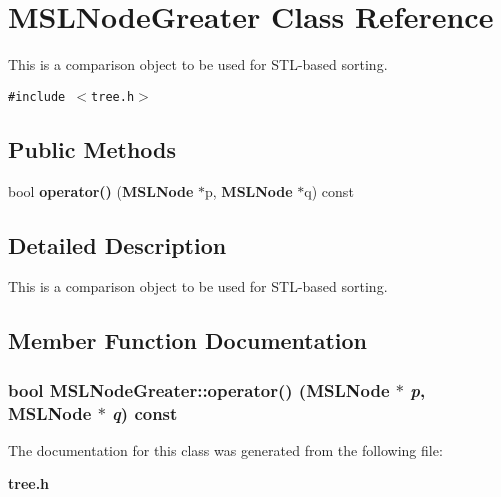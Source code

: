 \section{MSLNode\-Greater  Class Reference}
\label{classMSLNodeGreater}
This is a comparison object to be used for STL-based sorting. 


{\tt \#include $<$tree.h$>$}

\subsection*{Public Methods}
\begin{CompactItemize}
\item 
bool {\bf operator()} ({\bf MSLNode} $\ast$p, {\bf MSLNode} $\ast$q) const
\end{CompactItemize}


\subsection{Detailed Description}
This is a comparison object to be used for STL-based sorting.



\subsection{Member Function Documentation}
\subsubsection{\setlength{\rightskip}{0pt plus 5cm}bool MSLNode\-Greater::operator() ({\bf MSLNode} $\ast$ {\em p}, {\bf MSLNode} $\ast$ {\em q}) const\hspace{0.3cm}{\tt  [inline]}}\label{classMSLNodeGreater_a0}




The documentation for this class was generated from the following file:\begin{CompactItemize}
\item 
{\bf tree.h}\end{CompactItemize}
